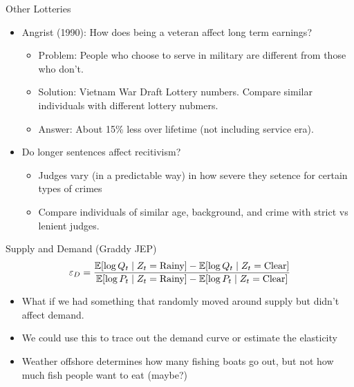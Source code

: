 \begin{frame}{Other Lotteries}
\begin{itemize}
\item Angrist (1990): How does being a veteran affect long term earnings?
\begin{itemize}
\item Problem: People who choose to serve in military are different from those who don't.
\item Solution: Vietnam War Draft Lottery numbers. Compare similar individuals with different lottery nubmers.
\item Answer: About 15\% less over lifetime (not including service era).
\end{itemize}
\item Do longer sentences affect recitivism?
\begin{itemize}
\item Judges vary (in a predictable way) in how severe they setence for certain types of crimes
\item Compare individuals of similar age, background, and crime with strict vs lenient judges.
\end{itemize}

\end{itemize}
\end{frame}



\begin{frame}{Supply and Demand (Graddy JEP)}
    \begin{align*}
    \varepsilon_D = \frac{\mathbb{E}[\log Q_t \mid Z_t = \text{Rainy}] - \mathbb{E}[\log Q_t \mid Z_t = \text{Clear}]}{\mathbb{E}[\log P_t \mid Z_t = \text{Rainy}] - \mathbb{E}[\log P_t \mid Z_t = \text{Clear}]}
    \end{align*}
\begin{itemize}
    \item What if we had something that randomly moved around \alert{supply} but didn't affect \alert{demand}.
    \item We could use this to trace out the demand curve or estimate the elasticity
    \item Weather offshore determines how many fishing boats go out, but not how much fish people want to eat (maybe?)
\end{itemize}
\end{frame}


